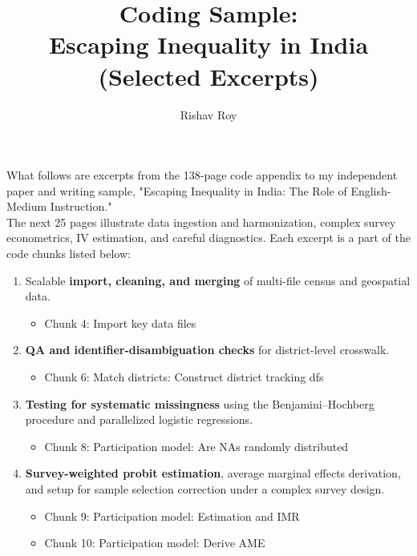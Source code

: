 \documentclass[letterpaper,12pt]{article}
\title{Coding Sample: \\ Escaping Inequality in India \\ \large{(Selected Excerpts)}}
\author{Rishav Roy}
\date{}
\begin{document}
\maketitle
\vspace{-6mm}
\noindent What follows are excerpts from the 138-page code appendix to my independent paper and writing sample, "Escaping Inequality in India: The Role of English-Medium Instruction." \\

\vspace{-2mm}
\noindent The next 25 pages illustrate data ingestion and harmonization, complex survey econometrics, IV estimation, and careful diagnostics. Each excerpt is a part of the code chunks listed below: 

\begin{enumerate}
\item[14-16:] Scalable \textbf{import, cleaning, and merging} of multi-file census and geospatial data.
\vspace{-2mm}
\begin{itemize}
\item Chunk 4: Import key data files
\end{itemize}
\vspace{-2mm}

\item[31-32:] \textbf{QA and identifier-disambiguation checks} for district-level crosswalk.
\vspace{-2mm}
\begin{itemize}
\item Chunk 6: Match districts: Construct district tracking dfs
\end{itemize}
\vspace{-2mm}

\item[50-52:] \textbf{Testing for systematic missingness} using the Benjamini–Hochberg procedure and parallelized logistic regressions. 
\vspace{-2mm}
\begin{itemize}
\item Chunk 8: Participation model: Are NAs randomly distributed
\end{itemize}
\vspace{-2mm}

\item[55-57:] \textbf{Survey-weighted probit estimation}, average marginal effects derivation, and setup for sample selection correction under a complex survey design.
\vspace{-2mm}
\begin{itemize}
\item Chunk 9: Participation model: Estimation and IMR 
\vspace{-1mm}
\item Chunk 10: Participation model: Derive AME
\end{itemize}
\vspace{-2mm}


\end{enumerate}
\end{document}
